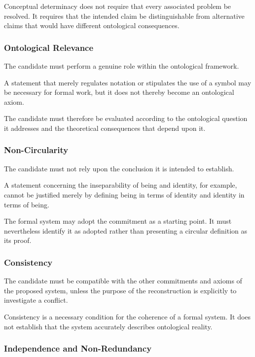 Conceptual determinacy does not require that
every associated problem be resolved. It requires
that the intended claim be distinguishable
from alternative claims that would have different
ontological consequences.

\subsubsection{Ontological Relevance}

The candidate must perform a genuine role
within the ontological framework.

A statement that merely regulates notation
or stipulates the use of a symbol may be
necessary for formal work, but it does not
thereby become an ontological axiom.

The candidate must therefore be evaluated
according to the ontological question it
addresses and the theoretical consequences
that depend upon it.

\subsubsection{Non-Circularity}

The candidate must not rely upon the conclusion
it is intended to establish.

A statement concerning the inseparability
of being and identity, for example, cannot
be justified merely by defining being in
terms of identity and identity in terms
of being.

The formal system may adopt the commitment
as a starting point. It must nevertheless
identify it as adopted rather than presenting
a circular definition as its proof.

\subsubsection{Consistency}

The candidate must be compatible with the
other commitments and axioms of the proposed
system, unless the purpose of the reconstruction
is explicitly to investigate a conflict.

Consistency is a necessary condition for
the coherence of a formal system. It does
not establish that the system accurately
describes ontological reality.

\subsubsection{Independence and Non-Redundancy}

